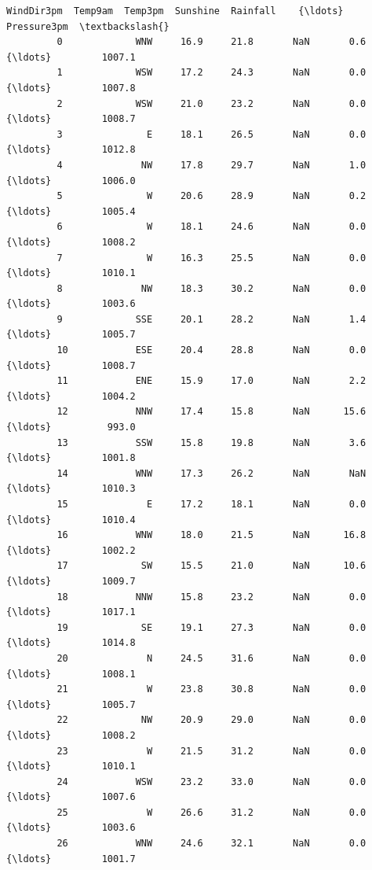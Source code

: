 \documentclass[11pt]{article}
\begin{document}
\begin{Verbatim}[commandchars=\\\{\}]
                WindDir3pm  Temp9am  Temp3pm  Sunshine  Rainfall    {\ldots}    Pressure3pm  \textbackslash{}
         0             WNW     16.9     21.8       NaN       0.6    {\ldots}         1007.1   
         1             WSW     17.2     24.3       NaN       0.0    {\ldots}         1007.8   
         2             WSW     21.0     23.2       NaN       0.0    {\ldots}         1008.7   
         3               E     18.1     26.5       NaN       0.0    {\ldots}         1012.8   
         4              NW     17.8     29.7       NaN       1.0    {\ldots}         1006.0   
         5               W     20.6     28.9       NaN       0.2    {\ldots}         1005.4   
         6               W     18.1     24.6       NaN       0.0    {\ldots}         1008.2   
         7               W     16.3     25.5       NaN       0.0    {\ldots}         1010.1   
         8              NW     18.3     30.2       NaN       0.0    {\ldots}         1003.6   
         9             SSE     20.1     28.2       NaN       1.4    {\ldots}         1005.7   
         10            ESE     20.4     28.8       NaN       0.0    {\ldots}         1008.7   
         11            ENE     15.9     17.0       NaN       2.2    {\ldots}         1004.2   
         12            NNW     17.4     15.8       NaN      15.6    {\ldots}          993.0   
         13            SSW     15.8     19.8       NaN       3.6    {\ldots}         1001.8   
         14            WNW     17.3     26.2       NaN       NaN    {\ldots}         1010.3   
         15              E     17.2     18.1       NaN       0.0    {\ldots}         1010.4   
         16            WNW     18.0     21.5       NaN      16.8    {\ldots}         1002.2   
         17             SW     15.5     21.0       NaN      10.6    {\ldots}         1009.7   
         18            NNW     15.8     23.2       NaN       0.0    {\ldots}         1017.1   
         19             SE     19.1     27.3       NaN       0.0    {\ldots}         1014.8   
         20              N     24.5     31.6       NaN       0.0    {\ldots}         1008.1   
         21              W     23.8     30.8       NaN       0.0    {\ldots}         1005.7   
         22             NW     20.9     29.0       NaN       0.0    {\ldots}         1008.2   
         23              W     21.5     31.2       NaN       0.0    {\ldots}         1010.1   
         24            WSW     23.2     33.0       NaN       0.0    {\ldots}         1007.6   
         25              W     26.6     31.2       NaN       0.0    {\ldots}         1003.6   
         26            WNW     24.6     32.1       NaN       0.0    {\ldots}         1001.7   

\end{Verbatim}
\end{document}
